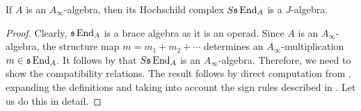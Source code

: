 \documentclass[Thesis.tex]{subfiles}
\begin{document}
\begin{corollary}\label{ainftydeligne}
If $A$ is an $A_\infty$-algebra, then its Hochschild complex $S\mathfrak{s}\operatorname{End}_A$ is a $J$-algebra.
\end{corollary}
\begin{proof}
 Clearly, $\mathfrak{s}\operatorname{End}_A$ is a brace algebra as it is an operad. Since $A$ is an $A_\infty$-algebra, the structure map $m=m_1+m_2+\cdots$ determines an $A_\infty$-multiplication $m\in\mathfrak{s}\operatorname{End}_A$. It follows by  that $S\mathfrak{s}\operatorname{End}_A$ is an $A_\infty$-algebra. Therefore, we need to show the compatibility relations. The result follows by direct computation from , expanding the definitions and taking into account the sign rules described in . Let us do this in detail. 
 

\end{proof}
\end{document}
